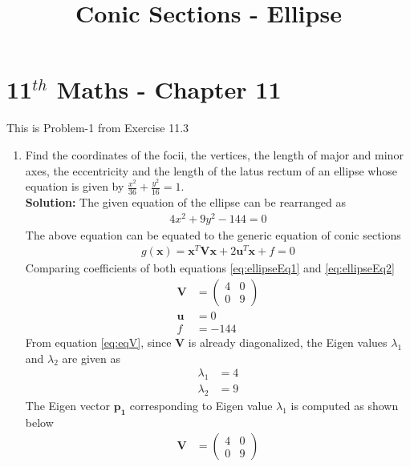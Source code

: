 \documentclass[12pt]{article}
\providecommand{\brak}[1]{\ensuremath{\left(#1\right)}}
\newcommand{\solution}{\noindent \textbf{Solution: }}
\newcommand{\myvec}[1]{\ensuremath{\begin{pmatrix}#1\end{pmatrix}}}
\let\vec\mathbf
\begin{document}
\begin{center}
\title{\textbf{Conic Sections - Ellipse}}
\date{\vspace{-5ex}} %
\maketitle
\end{center}
\setcounter{page}{1}

\section{11$^{th}$ Maths - Chapter 11}
This is Problem-1 from Exercise 11.3
\begin{enumerate}
	\item Find the coordinates of the focii, the vertices, the length of major and minor axes, the eccentricity and the length of the latus rectum of an ellipse whose equation is given by $\frac{x^2}{36}+\frac{y^2}{16} = 1$. \\ 
\solution 
The given equation of the ellipse can be rearranged as
\begin{align}
    \label{eq:ellipseEq1}
    4x^2 + 9y^2-144 = 0
\end{align}
The above equation can be equated to the generic equation of conic sections
\begin{align}
	\label{eq:ellipseEq2}
	g\brak{\vec{x}} = \vec{x}^T\vec{V}\vec{x} + 2\vec{u}^T\vec{x} + f = 0 
\end{align}
Comparing coefficients of both equations \eqref{eq:ellipseEq1} and \eqref{eq:ellipseEq2} 
\begin{align}
	\label{eq:eqV}
	\vec{V} &= \myvec{ 4 & 0 \\ 0 & 9} \\
	\label{eq:eqU}
	\vec{u} &=  0 \\
	\label{eq:eqF}
	f &= -144 
\end{align}
From equation \eqref{eq:eqV}, since $\vec{V}$ is already diagonalized, the Eigen values $\lambda_1$ and $\lambda_2$ are given as 
\begin{align}
	\label{eq:eqEigen1}
	\lambda_1 &= 4 \\
	\label{eq:eqEigen2}
	\lambda_2 &= 9 
\end{align}
The Eigen vector $\vec{p_1}$ corresponding to Eigen value $\lambda_1$ is computed as shown below
\begin{align}
	\vec{V} &= \myvec{ 4 & 0 \\ 0 & 9} \\

\end{align}
\end{enumerate}
\end{document}
